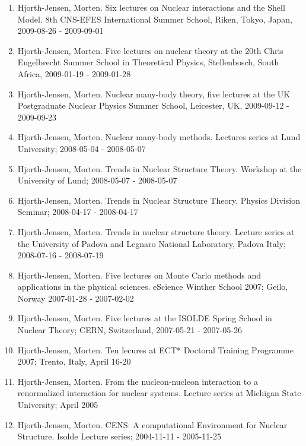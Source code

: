 \documentclass[a4wide,10pt]{article}
\begin{document}
\begin{enumerate}
\item Hjorth-Jensen, Morten.  Six lectures on Nuclear interactions and the Shell Model. 8th CNS-EFES International Summer School, Riken, Tokyo, Japan, 2009-08-26 - 2009-09-01

\item Hjorth-Jensen, Morten.  Five lectures on nuclear theory at the  20th Chris Engelbrecht Summer School in Theoretical Physics, Stellenbosch, South Africa,  2009-01-19 - 2009-01-28

\item Hjorth-Jensen, Morten.  Nuclear many-body theory, five lectures at the  UK Postgraduate Nuclear Physics Summer School, Leicester, UK,  2009-09-12 - 2009-09-23

\item Hjorth-Jensen, Morten.  Nuclear many-body methods. Lectures series at Lund University; 2008-05-04 - 2008-05-07

\item Hjorth-Jensen, Morten.  Trends in Nuclear Structure Theory. Workshop at the University of Lund; 2008-05-07 - 2008-05-07

\item Hjorth-Jensen, Morten.  Trends in Nuclear Structure Theory. Physics Division Seminar; 2008-04-17 - 2008-04-17

\item Hjorth-Jensen, Morten.  Trends in nuclear structure theory. Lecture series at the University of Padova and Legnaro National Laboratory, Padova Italy; 2008-07-16 - 2008-07-19

\item Hjorth-Jensen, Morten.  Five lectures on  Monte Carlo methods and applications in the physical sciences. eScience Winther School 2007; Geilo, Norway 2007-01-28 - 2007-02-02

\item Hjorth-Jensen, Morten.  Five lectures at the ISOLDE Spring School in Nuclear Theory; CERN, Switzerland, 2007-05-21 - 2007-05-26

\item Hjorth-Jensen, Morten.  Ten lecures at  ECT* Doctoral Training Programme 2007; Trento, Italy, April 16-20

\item Hjorth-Jensen, Morten.  From the nucleon-nucleon interaction to a renormalized interaction for nuclear systems. Lecture series at Michigan State University; April 2005

\item Hjorth-Jensen, Morten. CENS: A computational Environment for Nuclear Structure. Isolde Lecture series; 2004-11-11 - 2005-11-25
\end{enumerate}
\end{document}
